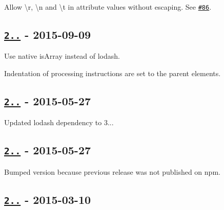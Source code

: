 \begin{DoxyItemize}
\item Allow {\ttfamily \textbackslash{}r}, {\ttfamily \textbackslash{}n} and {\ttfamily \textbackslash{}t} in attribute values without escaping. See \href{https://github.com/oozcitak/xmlbuilder-js/issues/86}{\tt \#86}.
\end{DoxyItemize}

\subsection*{\href{https://github.com/oozcitak/xmlbuilder-js/compare/v2.6.4...v2.6.5}{\tt 2..} -\/ 2015-\/09-\/09}


\begin{DoxyItemize}
\item Use native {\ttfamily is\+Array} instead of lodash.
\item Indentation of processing instructions are set to the parent element\textquotesingle{}s.
\end{DoxyItemize}

\subsection*{\href{https://github.com/oozcitak/xmlbuilder-js/compare/v2.6.3...v2.6.4}{\tt 2..} -\/ 2015-\/05-\/27}


\begin{DoxyItemize}
\item Updated lodash dependency to 3...
\end{DoxyItemize}

\subsection*{\href{https://github.com/oozcitak/xmlbuilder-js/compare/v2.6.2...v2.6.3}{\tt 2..} -\/ 2015-\/05-\/27}


\begin{DoxyItemize}
\item Bumped version because previous release was not published on npm.
\end{DoxyItemize}

\subsection*{\href{https://github.com/oozcitak/xmlbuilder-js/compare/v2.6.1...v2.6.2}{\tt 2..} -\/ 2015-\/03-\/10}


